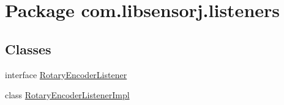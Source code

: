 \hypertarget{namespacecom_1_1libsensorj_1_1listeners}{}\section{Package com.\+libsensorj.\+listeners}
\label{namespacecom_1_1libsensorj_1_1listeners}
\subsection*{Classes}
\begin{DoxyCompactItemize}
\item 
interface \hyperlink{interfacecom_1_1libsensorj_1_1listeners_1_1RotaryEncoderListener}{Rotary\+Encoder\+Listener}
\item 
class \hyperlink{classcom_1_1libsensorj_1_1listeners_1_1RotaryEncoderListenerImpl}{Rotary\+Encoder\+Listener\+Impl}
\end{DoxyCompactItemize}

